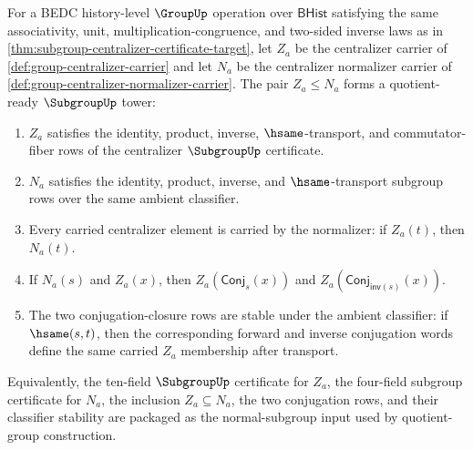 \begin{theorem}
\label{thm:subgroup-centralizer-normalizer-tower-certificate}
For a BEDC history-level $\GroupUp$ operation over $\mathsf{BHist}$ satisfying
the same associativity, unit, multiplication-congruence, and two-sided inverse
laws as in \autoref{thm:subgroup-centralizer-certificate-target}, let $Z_a$
be the centralizer carrier of \autoref{def:group-centralizer-carrier} and let
$N_a$ be the centralizer normalizer carrier of
\autoref{def:group-centralizer-normalizer-carrier}. The pair $Z_a\leq N_a$
forms a quotient-ready $\SubgroupUp$ tower:
\begin{enumerate}
\item $Z_a$ satisfies the identity, product, inverse, $\hsame$-transport, and
commutator-fiber rows of the centralizer $\SubgroupUp$ certificate.
\item $N_a$ satisfies the identity, product, inverse, and $\hsame$-transport
subgroup rows over the same ambient classifier.
\item Every carried centralizer element is carried by the normalizer: if
$Z_a(t)$, then $N_a(t)$.
\item If $N_a(s)$ and $Z_a(x)$, then
$Z_a(\mathsf{Conj}_s(x))$ and
$Z_a(\mathsf{Conj}_{\mathsf{inv}(s)}(x))$.
\item The two conjugation-closure rows are stable under the ambient
classifier: if $\hsame(s,t)$, then the corresponding forward and inverse
conjugation words define the same carried $Z_a$ membership after transport.
\end{enumerate}
Equivalently, the ten-field $\SubgroupUp$ certificate for $Z_a$, the
four-field subgroup certificate for $N_a$, the inclusion $Z_a\subseteq N_a$,
the two conjugation rows, and their classifier stability are packaged as the
normal-subgroup input used by quotient-group construction.
\end{theorem}
